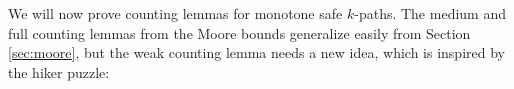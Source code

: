 \documentclass{theoretics}
\begin{document}






We will now prove counting lemmas for monotone safe $k$-paths.
The medium and full counting lemmas from the Moore bounds generalize easily from Section \ref{sec:moore}, but the weak counting lemma needs a new idea, which is inspired by the hiker puzzle:
\end{document}
